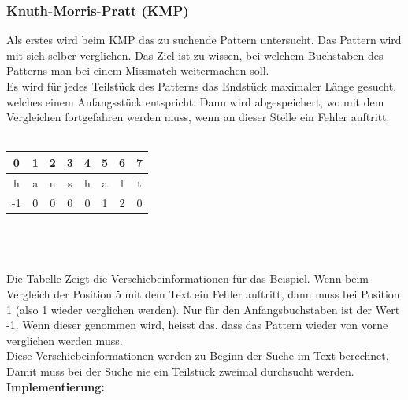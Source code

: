 \documentclass[a4paper,10pt]{article}
\newcommand{\Bold}[1]{\textbf{#1}} %
\begin{document}
\subsubsection{Knuth-Morris-Pratt (KMP)}
Als erstes wird beim KMP das zu suchende Pattern untersucht. Das Pattern wird mit sich selber verglichen. Das Ziel ist zu wissen, bei welchem Buchstaben des Patterns man bei einem Missmatch weitermachen soll. \\
Es wird für jedes Teilstück des Patterns das Endstück maximaler Länge gesucht, welches einem Anfangsstück entspricht. Dann wird abgespeichert, wo mit dem Vergleichen fortgefahren werden muss, wenn an dieser Stelle ein Fehler auftritt. \\ \\
\begin{tabular}{|c|c|c|c|c|c|c|c|}
	\hline 
	0 & 1 & 2 & 3 & 4 & 5 & 6 & 7 \\
	\hline
	h & a & u & s & h & a & l & t \\
	\hline
	-1 & 0 & 0 & 0 & 0 & 1 & 2 & 0 \\
	\hline
\end{tabular} \\ \\ \\
Die Tabelle Zeigt die Verschiebeinformationen für das Beispiel. Wenn beim Vergleich der Position 5 mit dem Text ein Fehler auftritt, dann muss bei Position 1 (also 1 wieder verglichen werden). Nur für den Anfangsbuchstaben ist der Wert -1. Wenn dieser genommen wird, heisst das, dass das Pattern wieder von vorne verglichen werden muss. \\
Diese Verschiebeinformationen werden zu Beginn der Suche im Text berechnet. Damit muss bei der Suche nie ein Teilstück zweimal durchsucht werden. \\

\Bold{Implementierung:}
\end{document}
